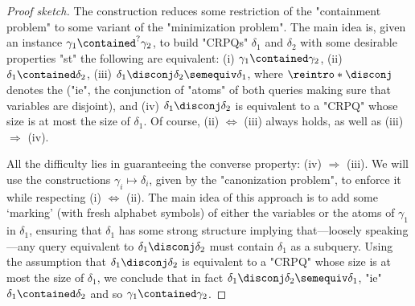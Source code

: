 \begin{proof}[Proof sketch]
	The construction reduces some restriction of the "containment problem"
	to some variant of the "minimization problem". The main idea is,
	given an instance $\gamma_1 \contained^? \gamma_2$, to build "CRPQs"
	$\delta_1$ and $\delta_2$ with some desirable properties "st" the following are equivalent: (i)
	$\gamma_1 \contained \gamma_2$, (ii) $\delta_1 \contained \delta_2$,
	(iii) $\delta_1 \disconj \delta_2 \semequiv \delta_1$,
	where $\reintro*\disconj$ denotes the  ("ie", the conjunction of "atoms" of both queries making sure that variables are disjoint), and
	(iv) $\delta_1 \disconj \delta_2$ is equivalent to a
	"CRPQ" whose size is at most the size of $\delta_1$.
	Of course, (ii) $\Leftrightarrow$ (iii) always holds, as well as (iii) $\Rightarrow$ (iv).

	All the difficulty lies in guaranteeing the converse property: (iv) $\Rightarrow$ (iii).
	We will use the constructions $\gamma_i \mapsto \delta_i$, given
	by the "canonization problem", to enforce it
	while respecting (i) $\Leftrightarrow$ (ii). 
	The main idea of this approach is to add some `marking' (with fresh alphabet symbols) of either the variables or the atoms of $\gamma_1$ in $\delta_1$, ensuring that
	$\delta_1$ has some strong structure implying that---loosely speaking---any query equivalent to $\delta_1 \disconj \delta_2$ must contain $\delta_1$ as a subquery.
	Using the assumption that $\delta_1 \disconj \delta_2$ is equivalent to a
	"CRPQ" whose size is at most the size of $\delta_1$, we conclude that in fact $\delta_1 \disconj \delta_2 \semequiv \delta_1$, "ie" $\delta_1 \contained \delta_2$ and so $\gamma_1 \contained \gamma_2$. 
\end{proof}

